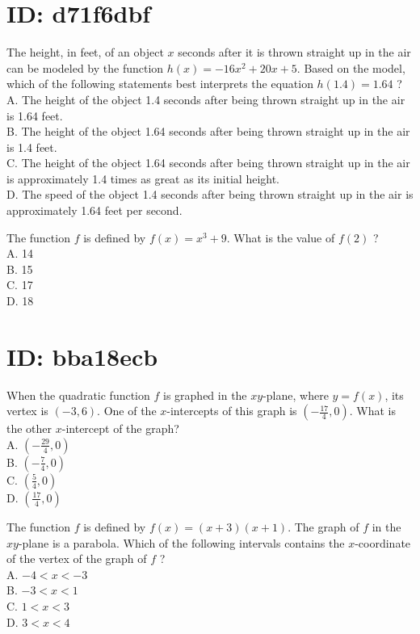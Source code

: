 \section*{ID: d71f6dbf}
The height, in feet, of an object $x$ seconds after it is thrown straight up in the air can be modeled by the function $h(x)=-16 x^{2}+20 x+5$. Based on the model, which of the following statements best interprets the equation $h(1.4)=1.64$ ?\\
A. The height of the object 1.4 seconds after being thrown straight up in the air is 1.64 feet.\\
B. The height of the object 1.64 seconds after being thrown straight up in the air is 1.4 feet.\\
C. The height of the object 1.64 seconds after being thrown straight up in the air is approximately 1.4 times as great as its initial height.\\
D. The speed of the object 1.4 seconds after being thrown straight up in the air is approximately 1.64 feet per second.

The function $f$ is defined by $f(x)=x^{3}+9$. What is the value of $f(2)$ ?\\
A. 14\\
B. 15\\
C. 17\\
D. 18

\section*{ID: bba18ecb}
When the quadratic function $f$ is graphed in the $x y$-plane, where $y=f(x)$, its vertex is $(-3,6)$. One of the $x$-intercepts of this graph is $\left(-\frac{17}{4}, 0\right)$. What is the other $x$-intercept of the graph?\\
A. $\left(-\frac{29}{4}, 0\right)$\\
B. $\left(-\frac{7}{4}, 0\right)$\\
C. $\left(\frac{5}{4}, 0\right)$\\
D. $\left(\frac{17}{4}, 0\right)$

The function $f$ is defined by $f(x)=(x+3)(x+1)$. The graph of $f$ in the $x y$-plane is a parabola. Which of the following intervals contains the $x$-coordinate of the vertex of the graph of $f$ ?\\
A. $-4<x<-3$\\
B. $-3<x<1$\\
C. $1<x<3$\\
D. $3<x<4$

